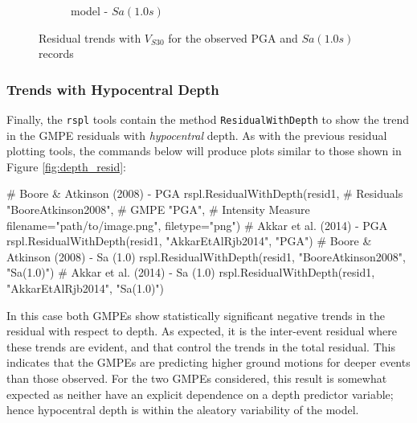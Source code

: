 \begin{figure}[htb]
\begin{subfigure}[b]{0.49\textwidth}
     \caption{\cite{Akkar_etal2014} model - $Sa \left( {1.0 s} \right)$}
      \label{fig:sa1_vs30_akkar2014}
  \end{subfigure}
  \caption{Residual trends with $V_{S30}$ for the observed PGA and $Sa \left( {1.0 s} \right)$ records}
  \label{fig:vs30_resid}
\end{figure}

\subsubsection{Trends with Hypocentral Depth}

Finally, the \verb=rspl= tools contain the method \verb=ResidualWithDepth= to show the trend in the GMPE residuals with \emph{hypocentral} depth. As with the previous residual plotting tools, the commands below will produce plots similar to those shown in Figure \ref{fig:depth_resid}:

 \begin{python}[frame=single]
# Boore & Atkinson (2008)  - PGA
rspl.ResidualWithDepth(resid1,  # Residuals
                      "BooreAtkinson2008",  # GMPE
                      "PGA",   # Intensity Measure
                      filename="path/to/image.png",
                      filetype="png")
# Akkar et al. (2014)  - PGA
rspl.ResidualWithDepth(resid1, "AkkarEtAlRjb2014", "PGA") 
# Boore & Atkinson (2008)  - Sa (1.0)
rspl.ResidualWithDepth(resid1, "BooreAtkinson2008", "Sa(1.0)") 
# Akkar et al. (2014)  - Sa (1.0)
rspl.ResidualWithDepth(resid1, "AkkarEtAlRjb2014", "Sa(1.0)")                         
\end{python}

In this case both GMPEs show statistically significant negative trends in the residual with respect to depth. As expected, it is the inter-event residual where these trends are evident, and that control the trends in the total residual. This indicates that the GMPEs are predicting higher ground motions for deeper events than those observed. For the two GMPEs considered, this result is somewhat expected as neither have an explicit dependence on a depth predictor variable; hence hypocentral depth is within the aleatory variability of the model. 

